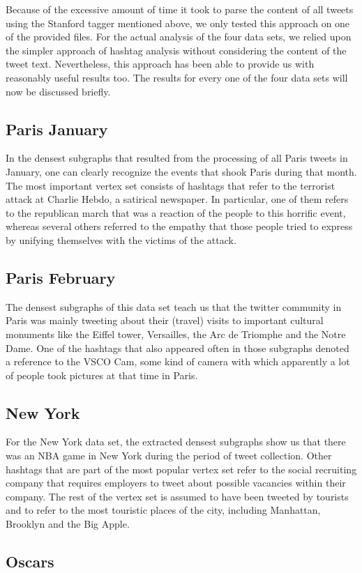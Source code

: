 \documentclass[10pt,a4paper]{article}
\begin{document}
Because of the excessive amount of time it took to parse the content of all tweets using the Stanford tagger mentioned above, we only tested this approach on one of the provided files. For the actual analysis of the four data sets, we relied upon the simpler approach of hashtag analysis without considering the content of the tweet text. Nevertheless, this approach has been able to provide us with reasonably useful results too. The results for every one of the four data sets will now be discussed briefly.

\subsection{Paris January}

In the densest subgraphs that resulted from the processing of all Paris tweets in January, one can clearly recognize the events that shook Paris during that month. The most important vertex set consists of hashtags that refer to the terrorist attack at Charlie Hebdo, a satirical newspaper. In particular, one of them refers to the republican march that was a reaction of the people to this horrific event, whereas several others referred to the empathy that those people tried to express by unifying themselves with the victims of the attack.

\subsection{Paris February}

The densest subgraphs of this data set teach us that the twitter community in Paris was mainly tweeting about their (travel) visits to important cultural monuments like the Eiffel tower, Versailles, the Arc de Triomphe and the Notre Dame. One of the hashtags that also appeared often in those subgraphs denoted a reference to the VSCO Cam, some kind of camera with which apparently a lot of people took pictures at that time in Paris.

\subsection{New York}

For the New York data set, the extracted densest subgraphs show us that there was an NBA game in New York during the period of tweet collection. Other hashtags that are part of the most popular vertex set refer to the social recruiting company that requires employers to tweet about possible vacancies within their company. The rest of the vertex set is assumed to have been tweeted by tourists and to refer to the most touristic places of the city, including Manhattan, Brooklyn and the Big Apple.

\subsection{Oscars}
\end{document}
